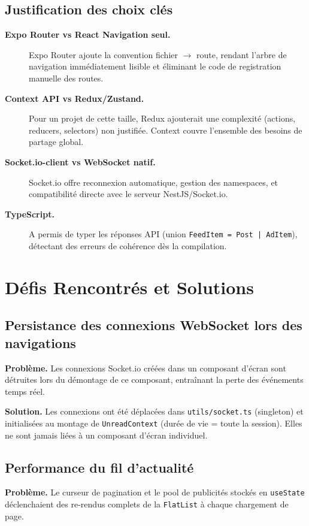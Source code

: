 \subsection{Justification des choix clés}

\begin{description}
  \item[\textbf{Expo Router vs React Navigation seul.}] Expo Router ajoute la convention fichier $\to$ route, rendant l'arbre de navigation immédiatement lisible et éliminant le code de registration manuelle des routes.
  \item[\textbf{Context API vs Redux/Zustand.}] Pour un projet de cette taille, Redux ajouterait une complexité (actions, reducers, selectors) non justifiée. Context couvre l'ensemble des besoins de partage global.
  \item[\textbf{Socket.io-client vs WebSocket natif.}] Socket.io offre reconnexion automatique, gestion des namespaces, et compatibilité directe avec le serveur NestJS/Socket.io.
  \item[\textbf{TypeScript.}] A permis de typer les réponses API (union \texttt{FeedItem = Post | AdItem}), détectant des erreurs de cohérence dès la compilation.
\end{description}

\section{Défis Rencontrés et Solutions}

\subsection{Persistance des connexions WebSocket lors des navigations}

\textbf{Problème.} Les connexions Socket.io créées dans un composant d'écran sont détruites lors du démontage de ce composant, entraînant la perte des événements temps réel.

\textbf{Solution.} Les connexions ont été déplacées dans \texttt{utils/socket.ts} (singleton) et initialisées au montage de \texttt{UnreadContext} (durée de vie = toute la session). Elles ne sont jamais liées à un composant d'écran individuel.

\subsection{Performance du fil d'actualité}

\textbf{Problème.} Le curseur de pagination et le pool de publicités stockés en \texttt{useState} déclenchaient des re-rendus complets de la \texttt{FlatList} à chaque chargement de page.

